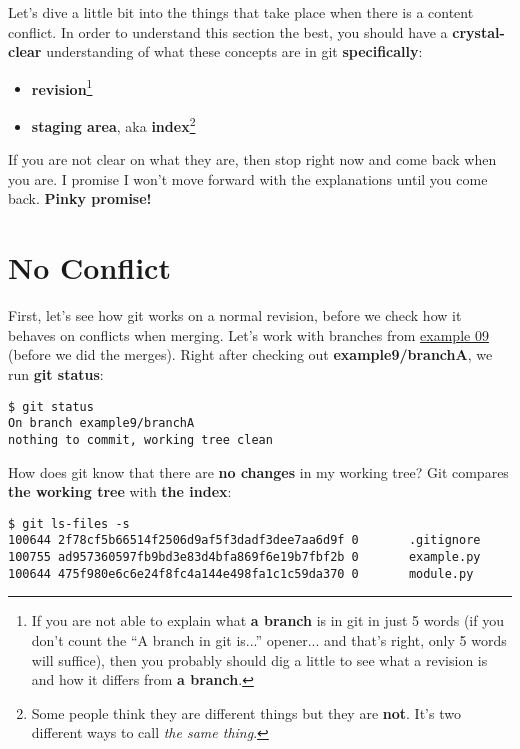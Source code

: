 
Let's dive a little bit into the things that take place when there is a content conflict. In order to understand this section
the best, you should have a {\bf crystal-clear} understanding of what these concepts are in git {\bf specifically}:

\begin{itemize}
	\item {\bf revision}\footnote{If you are not able to explain what {\bf a branch} is in git in just 5 words
	(if you don't count the ``A branch in git is...'' opener... and that's right, only 5 words will suffice),
	then you probably should dig a little to see what a revision is and how it differs from {\bf a branch}.}
	\item {\bf staging area}, aka {\bf index}\footnote{Some people think they are different things but they are {\bf not}.
	It's two different ways to call {\it the same thing}.}
\end{itemize}

If you are not clear on what they are, then stop right now and come back when you are. I promise I won't move forward with
the explanations until you come back. {\bf Pinky promise!}

\section{No Conflict}
First, let's see how git works on a normal revision, before we check how it behaves on conflicts when merging. Let's work
with branches from \hyperref[example_09]{example 09} (before we did the merges). Right after checking out {\bf example9/branchA},
we run {\bf git status}:

\begin{lstlisting}[style=console_style,
	basicstyle=\small,
	caption={\bf git status} on clean working tree]
$ git status
On branch example9/branchA
nothing to commit, working tree clean
\end{lstlisting}

How does git know that there are {\bf no changes} in my working tree? Git compares {\bf the working tree} with {\bf the index}:

\begin{lstlisting}[style=console_style,
	basicstyle=\small,
	caption={\bf git ls-files} on clean working tree]
$ git ls-files -s
100644 2f78cf5b66514f2506d9af5f3dadf3dee7aa6d9f 0       .gitignore
100755 ad957360597fb9bd3e83d4bfa869f6e19b7fbf2b 0       example.py
100644 475f980e6c6e24f8fc4a144e498fa1c1c59da370 0       module.py
\end{lstlisting}

